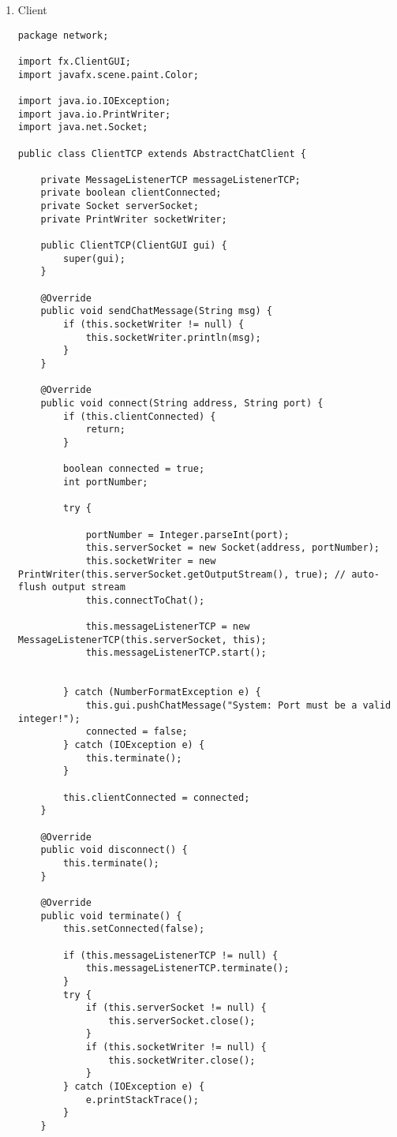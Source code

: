 \begin{enumerate}

\item Client \\

\begin{lstlisting}[style=java]
package network;

import fx.ClientGUI;
import javafx.scene.paint.Color;

import java.io.IOException;
import java.io.PrintWriter;
import java.net.Socket;

public class ClientTCP extends AbstractChatClient {

    private MessageListenerTCP messageListenerTCP;
    private boolean clientConnected;
    private Socket serverSocket;
    private PrintWriter socketWriter;

    public ClientTCP(ClientGUI gui) {
        super(gui);
    }

    @Override
    public void sendChatMessage(String msg) {
        if (this.socketWriter != null) {
            this.socketWriter.println(msg);
        }
    }

    @Override
    public void connect(String address, String port) {
        if (this.clientConnected) {
            return;
        }

        boolean connected = true;
        int portNumber;

        try {

            portNumber = Integer.parseInt(port);
            this.serverSocket = new Socket(address, portNumber);
            this.socketWriter = new PrintWriter(this.serverSocket.getOutputStream(), true); // auto-flush output stream
            this.connectToChat();

            this.messageListenerTCP = new MessageListenerTCP(this.serverSocket, this);
            this.messageListenerTCP.start();


        } catch (NumberFormatException e) {
            this.gui.pushChatMessage("System: Port must be a valid integer!");
            connected = false;
        } catch (IOException e) {
            this.terminate();
        }

        this.clientConnected = connected;
    }

    @Override
    public void disconnect() {
        this.terminate();
    }

    @Override
    public void terminate() {
        this.setConnected(false);

        if (this.messageListenerTCP != null) {
            this.messageListenerTCP.terminate();
        }
        try {
            if (this.serverSocket != null) {
                this.serverSocket.close();
            }
            if (this.socketWriter != null) {
                this.socketWriter.close();
            }
        } catch (IOException e) {
            e.printStackTrace();
        }
    }


\end{lstlisting}
\end{enumerate}
